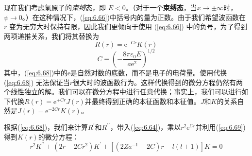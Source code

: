    现在我们考虑氢原子的\textit{束缚}态，即 $E < 0$。（对于一个\textbf{束缚态}，当$x \to \pm \infty$时，$\psi \to 0$。）在这种情况下，(\ref{eq:6.66})中括号内的量为正数。由于我们希望波函数在 $r$ 变为无穷大时保持有限，因此我们更倾向于使用 (\ref{eq:6.66}) 中的负号，为了得到两项递推关系，我们将其替换为
   \begin{equation}
        R\left(r\right) = \mathrm{e}^{-Cr}K\left(r\right)
        \label{eq:6.68}
   \end{equation}
   \begin{equation}
        C \equiv \left(-\frac{8\pi\varepsilon_0E}{a\mathrm{e}^2}\right)^{1/2}
        \label{eq:6.69}
   \end{equation}
   其中，(\ref{eq:6.68})中的$\mathrm{e}$是自然对数的底数，而不是电子的电荷量。使用代换 (\ref{eq:6.68}) 无法保证当$r$很大时的波函数行为。这样代换得到的微分方程仍然有两个线性独立的解。我们可以在微分方程中进行任意代换；事实上，我们可以进行如下代换$R\left(r\right) = \mathrm{e}^{+Cr}J\left(r\right)$并最终得到正确的本征函数和本征值。$J$和$K$的关系自然是$J\left(r\right) = \mathrm{e}^{-2Cr}K\left(r\right)$。

   根据(\ref{eq:6.68})，我们来计算$R^{\prime}$和$R^{\prime\prime}$，带入(\ref{eq:6.64})，乘以$r^2\mathrm{e}^{Cr}$并利用(\ref{eq:6.69})得到$K\left(r\right)$的微分方程：
   \begin{equation}
        r^2K^{\prime\prime} + \left(2r - 2Cr^2\right)K^{\prime} + \left[\left(2Za^{-1} - 2C\right)r - l\left(l+1\right)\right]K = 0
        \label{eq:6.70}
   \end{equation}

